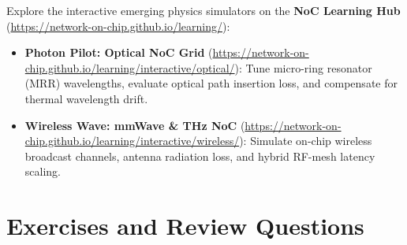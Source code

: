 Explore the interactive emerging physics simulators on the \textbf{NoC Learning Hub} (\url{https://network-on-chip.github.io/learning/}):
\begin{itemize}
    \item \textbf{Photon Pilot: Optical NoC Grid} (\url{https://network-on-chip.github.io/learning/interactive/optical/}): Tune micro-ring resonator (MRR) wavelengths, evaluate optical path insertion loss, and compensate for thermal wavelength drift.
    \item \textbf{Wireless Wave: mmWave \& THz NoC} (\url{https://network-on-chip.github.io/learning/interactive/wireless/}): Simulate on-chip wireless broadcast channels, antenna radiation loss, and hybrid RF-mesh latency scaling.
\end{itemize}

\section{Exercises and Review Questions}
\label{sec:ch10_exercises}

